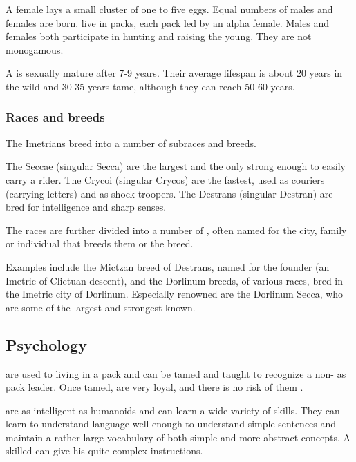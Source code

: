 A \nycan{} female lays a small cluster of one to five eggs. Equal numbers of males and females are born. \Nycans{} live in packs, each pack led by an alpha female. Males and females both participate in hunting and raising the young. They are not monogamous. 

A \nycan{} is sexually mature after 7-9 years. Their average lifespan is about 20 years in the wild and 30-35 years tame, although they can reach 50-60 years. 





\subsubsection{Races and breeds}
The Imetrians breed \nycans{} into a number of subraces and breeds. 


The Seccae (singular Secca) are the largest and the only \nycans{} strong enough to easily carry a rider. 
The Crycoi (singular Crycos) are the fastest, used as couriers (carrying letters) and as shock troopers. 
The Destrans (singular Destran) are bred for intelligence and sharp senses. 

The races are further divided into a number of , often named for the city, family or individual that breeds them or  the breed. 

Examples include the Mictzan breed of Destrans, named for the founder (an Imetric \scatha{} of Clictuan descent), and the Dorlinum breeds, of various races, bred in the Imetric city of Dorlinum. Especially renowned are the Dorlinum Secca, who are some of the largest and strongest \nycans{} known. 









\subsection{Psychology}
\Nycans{} are used to living in a pack and can be tamed and taught to recognize a non-\nycan{} as pack leader. Once tamed, \nycans{} are very loyal, and there is no risk of them . 

\Nycans{} are as intelligent as humanoids and can learn a wide variety of skills. They can learn to understand language well enough to understand simple sentences and maintain a rather large vocabulary of both simple and more abstract concepts. A skilled  can give his \nycans{} quite complex instructions. 





